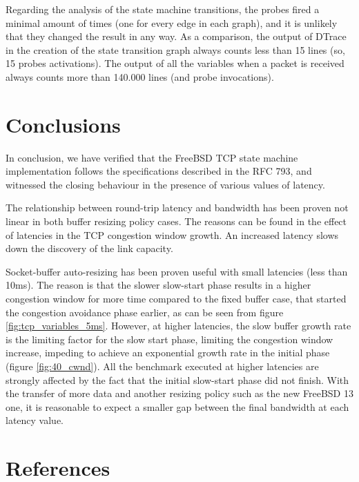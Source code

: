 \documentclass[a4paper,10pt]{article}
\begin{document}
Regarding the analysis of the state machine transitions, the probes fired a minimal amount of times (one for every edge in each graph), and it is unlikely that they changed the result in any way. As a comparison, the output of DTrace in the creation of the state transition graph always counts less than 15 lines (so, 15 probes activations). The output of all the variables when a packet is received always counts more than 140.000 lines (and probe invocations).


\section{Conclusions}

In conclusion, we have verified that the FreeBSD TCP state machine implementation follows the specifications described in the RFC 793\cite{RFC793}, and witnessed the closing behaviour in the presence of various values of latency.

The relationship between round-trip latency and bandwidth has been proven not linear in both buffer resizing policy cases. The reasons can be found in the effect of latencies in the TCP congestion window growth. An increased latency slows down the discovery of the link capacity. 

Socket-buffer auto-resizing has been proven useful with small latencies (less than 10ms). The reason is that the slower slow-start phase results in a higher congestion window for more time compared to the fixed buffer case, that started the congestion avoidance phase earlier, as can be seen from figure \ref{fig:tcp_variables_5ms}.
However,  at higher latencies, the slow buffer growth rate is the limiting factor for the slow start phase, limiting the congestion window increase, impeding to achieve an exponential growth rate in the initial phase (figure \ref{fig:40_cwnd}).  
All the benchmark executed at higher latencies are strongly affected by the fact that the initial slow-start phase did not finish. With the transfer of more data and another resizing policy such as the new FreeBSD 13 one, it is reasonable to expect a smaller gap between the final bandwidth at each latency value.

\newpage

\section{References}

\printbibliography

\end{document}
